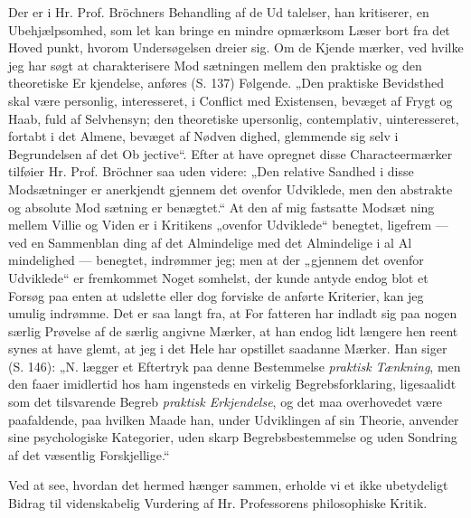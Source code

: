 \documentclass[12pt]{book}
\newcommand{\opage}[1]{\marginnote{\footnotesize\textit{[#1]}}}
\begin{document}
Der er i Hr. Prof. Bröchners Behandling af de Ud\-%
talelser, han kritiserer, en Ubehjælpsomhed, som let kan
bringe en mindre opmærksom Læser bort fra det Hoved\-%
punkt, hvorom Undersøgelsen dreier sig. Om de Kjende\-%
mærker, ved hvilke jeg har søgt at charakterisere Mod\-%
sætningen mellem den praktiske og den theoretiske Er\-%
kjendelse, anføres (S. 137) Følgende. „Den praktiske
Bevidsthed skal være personlig, interesseret, i Conflict
med Existensen, bevæget af Frygt og Haab, fuld af
\opage{23}\setcounter{footnote}{0}%
Selvhensyn; den theoretiske upersonlig, contemplativ,
uinteresseret, fortabt i det Almene, bevæget af Nødven\-%
dighed, glemmende sig selv i Begrundelsen af det Ob\-%
jective“. Efter at have opregnet disse Characteermærker
tilføier Hr. Prof. Bröchner saa uden videre: „Den relative
Sandhed i disse Modsætninger er anerkjendt gjennem det
ovenfor Udviklede, men den abstrakte og absolute Mod\-%
sætning er benægtet.“ At den af mig fastsatte Modsæt\-%
ning mellem Villie og Viden er i Kritikens „ovenfor
Udviklede“ benegtet, ligefrem --- ved en Sammenblan\-%
ding af det Almindelige med det Almindelige i al Al\-%
mindelighed --- benegtet, indrømmer jeg; men at der
„gjennem det ovenfor Udviklede“ er fremkommet Noget\-%
somhelst, der kunde antyde endog blot et Forsøg paa
enten at udslette eller dog forviske de anførte Kriterier,
kan jeg umulig indrømme. Det er saa langt fra, at For\-%
fatteren har indladt sig paa nogen særlig Prøvelse af de
særlig angivne Mærker, at han endog lidt længere hen
reent synes at have glemt, at jeg i det Hele har opstillet
saadanne Mærker. Han siger (S. 146): „N. lægger et
Eftertryk paa denne Bestemmelse \emph{praktisk Tænkning},
men den faaer imidlertid hos ham ingensteds en virkelig
Begrebsforklaring, ligesaalidt som det tilsvarende Begreb
\emph{praktisk Erkjendelse}, og det maa overhovedet være
paafaldende, paa hvilken Maade han, under Udviklingen
af sin Theorie, anvender sine psychologiske Kategorier,
uden skarp Begrebsbestemmelse og uden Sondring af
det væsentlig Forskjellige.“

Ved at see, hvordan det hermed hænger sammen,
erholde vi et ikke ubetydeligt Bidrag til videnskabelig
Vurdering af Hr. Professorens philosophiske Kritik.
\end{document}
